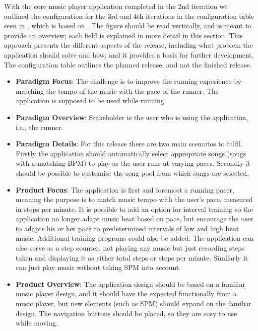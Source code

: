 With the core music player application completed in the 2nd iteration we outlined the configuration for the 3rd and 4th iterations in the configuration table seen in , which is based on \citet[ch. 3]{essence:config}. The figure should be read vertically, and is meant to provide an overview; each field is explained in more detail in this section. This approach presents the different aspects of the release, including what problem the application should solve and how, and it provides a basis for further development. The configuration table outlines the planned release, and not the finished release.




\begin{itemize}
\item \textbf{Paradigm Focus}: The challenge is to improve the running experience by matching the tempo of the music with the pace of the runner. The application is supposed to be used while running.

\item \textbf{Paradigm Overview}: Stakeholder is the user who is using the application, i.e., the runner.

\item \textbf{Paradigm Details}: For this release there are two main scenarios to fulfil. Firstly the application should automatically select appropriate songs (songs with a matching BPM) to play as the user runs at varying paces. Secondly it should be possible to customise the song pool from which songs are selected.
\item \textbf{Product Focus}: The application is first and foremost a running pacer, meaning the purpose is to match music tempo with the user's pace, measured in steps per minute. It is possible to add an option for interval training so the application no longer adapt music beat based on pace, but encourage the user to adapts his or her pace to predetermined intervals of low and high beat music. Additional training programs could also be added. The application can also serve as a step counter, not playing any music but just recording steps taken and displaying it as either total steps or steps per minute. Similarly it can just play music without taking SPM into account.

\item \textbf{Product Overview}: The application design should be based on a familiar music player design, and it should have the expected functionally from a music player, but new elements (such as SPM) should expand on the familiar design. The navigation buttons should be placed, so they are easy to use while moving.


\end{itemize}
